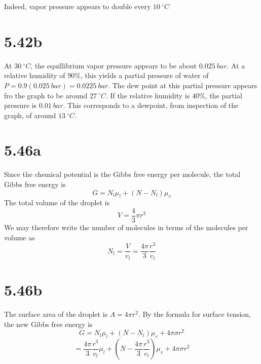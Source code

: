 \documentclass{article}
\begin{document}
Indeed, vapor pressure appears to double every $\SI{10}{^{\circ}C}$

\section*{5.42b}
At $\SI{30}{^{\circ}C}$, the equillibrium vapor pressure appears to be about $\SI{0.025}{bar}$. At a relative humidity of $90\%$, this yields a partial pressure of water of $P=0.9(\SI{0.025}{bar})=\SI{0.0225}{bar}$. The dew point at this partial pressure appears fro the graph to be around $\SI{27}{^{\circ}C}$. If the relative humidity is $40\%$, the partial pressure is $\SI{0.01}{bar}$. This corresponds to a dewpoint, from inspection of the graph, of around $\SI{13}{^{\circ}C}$.

\section*{5.46a}
Since the chemical potential is the Gibbs free energy per molecule, the total Gibbs free energy is
\[G=N_{l}\mu_{l}+(N-N_{l})\mu_{v}\]
The total volume of the droplet is
\[V=\frac{4}{3}\pi r^{3}\]
We may therefore write the number of molecules in terms of the molecules per volume as
\[N_{l}=\frac{V}{v_{l}}=\frac{4\pi}{3}\frac{r^{3}}{v_{l}}\]

\section*{5.46b}
The surface area of the droplet is $A=4\pi r^{2}$. By the formula for surface tension, the new Gibbs free energy is
\[G=N_{l}\mu_{l}+(N-N_{l})\mu_{v}+4\pi\sigma r^{2}\]
\[=\frac{4\pi}{3}\frac{r^{3}}{v_{l}}\mu_{l}+\left( N-\frac{4\pi}{3}\frac{r^{3}}{v_{l}} \right)\mu_{v}+4\pi\sigma r^{2}\]
\end{document}
